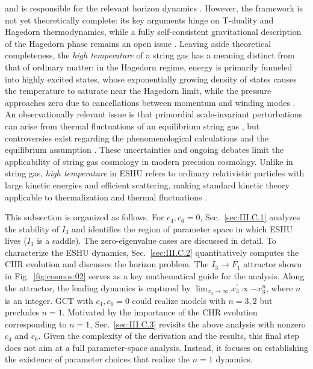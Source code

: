 \documentclass[aps,prd,twocolumn]{revtex4-2}
\begin{document}
\cite{Brandenberger1989.NuclPhysB.316.391,Tseytlin1992.NuclPhysB.372.443} and is responsible for the relevant horizon dynamics \cite{Nayeri2006.PRL.97.021302}. However, the framework is not yet theoretically complete: its key arguments hinge on T-duality and Hagedorn thermodynamics, while a fully self-consistent gravitational description of the Hagedorn phase remains an open issue \cite{Nayeri2006.PRL.97.021302,Kaloper2006.JCAP.10.006,Brandenberger2011.CQG.28.204005}. Leaving aside theoretical completeness, the \textit{high temperature} of a string gas has a meaning distinct from that of ordinary matter: in the Hagedorn regime, energy is primarily funneled into highly excited states, whose exponentially growing density of states causes the temperature to saturate near the Hagedorn limit, while the pressure approaches zero due to cancellations between momentum and winding modes \cite{Deo1989.PRD.40.2626,Lowe1995.PRD.51.665,Nayeri2006.PRL.97.021302}. An observationally relevant issue is that primordial scale-invariant perturbations can arise from thermal fluctuations of an equilibrium string gas \cite{Nayeri2006.PRL.97.021302,Brandenberger2006.JCAP.11.009}, but controversies exist regarding the phenomenological calculations \cite{Kaloper2006.JCAP.10.006} and the equilibrium assumption \cite{Danos2004.PRD.70.106010}. These uncertainties and ongoing debates limit the applicability of string gas cosmology in modern precision cosmology. Unlike in string gas, \textit{high temperature} in ESHU refers to ordinary relativistic particles with large kinetic energies and efficient scattering, making standard kinetic theory applicable to thermalization and thermal fluctuations \cite{Reif1965.book}.

This subsection is organized as follows. For $c_4,c_6=0$, Sec.~\ref{sec:III.C.1} analyzes the stability of $I_3$ and identifies the region of parameter space in which ESHU lives ($I_3$ is a saddle). The zero-eigenvalue cases are discussed in detail. To characterize the ESHU dynamics, Sec.~\ref{sec:III.C.2} quantitatively computes the CHR evolution and discusses the horizon problem. The $I_3\rightarrow F_1$ attractor shown in Fig.~\ref{fig:cosmos:02} serves as a key mathematical guide for the analysis. Along the attractor, the leading dynamics is captured by $\lim_{x_3\rightarrow\infty}x_3^\prime\propto-x_3^n$, where $n$ is an integer. GCT with $c_4,c_6=0$ could realize models with $n=3,2$ but precludes $n=1$. Motivated by the importance of the CHR evolution corresponding to $n=1$, Sec.~\ref{sec:III.C.3} revisits the above analysis with nonzero $c_4$ and $c_6$. Given the complexity of the derivation and the results, this final step does not aim at a full parameter-space analysis. Instead, it focuses on establishing the existence of parameter choices that realize the $n=1$ dynamics.
\end{document}
